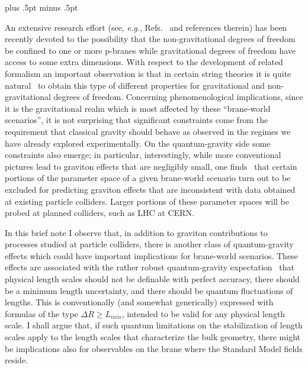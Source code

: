 \newpage
\baselineskip 12pt plus .5pt minus .5pt
\pagestyle{plain} 


An extensive research effort (see, {\it e.g.}, 
Refs.~\cite{addlarge,bw,grwlarge,rs1,rs2,coka,lei,gfg} 
and references therein) has been recently devoted to
the possibility that the non-gravitational degrees of freedom 
be confined to one or more p-branes while 
gravitational degrees of freedom have access 
to some extra dimensions.
With respect to the development of related
formalism an important observation
is that in certain string theories it is quite natural~\cite{bw}
to obtain this type of different properties for gravitational and
non-gravitational degrees of freedom.
Concerning phenomenological implications, 
since it is the gravitational realm which is most affected
by these ``brane-world scenarios'', it is not surprising that
significant constraints come from the requirement that 
classical gravity should behave as observed in the regimes 
we have already explored experimentally.
On the quantum-gravity side some constraints also emerge;
in particular, interestingly,
while more conventional pictures lead
to graviton effects that are negligibly small, 
one finds~\cite{grwlarge}
that certain portions of the parameter
space of a given brane-world scenario turn out to be
excluded for predicting graviton effects that are inconsistent
with data obtained at existing particle colliders.
Larger portions of these parameter spaces will be probed
at planned colliders, such as LHC at CERN.

In this brief note I observe that, in addition to graviton
contributions to processes studied at particle colliders,
there is another class of quantum-gravity
effects which could have important implications for brane-world scenarios.
These effects are associated with 
the rather robust quantum-gravity 
expectation~\cite{wheely,venekonmen,padma,dharam94grf,gacmpla,dbrscatt}  
that physical length scales should not be definable with perfect accuracy,
there should be a minimum length uncertainty, 
and there should be quantum fluctuations of lengths.
This is conventionally (and somewhat generically) expressed with
formulas of the type $\Delta R \ge L_{min}$, intended to be
valid for any physical length scale.
I shall argue that, if 
such quantum limitations on the stabilization of length scales
apply to the length scales that characterize the bulk geometry,
there might be implications also for observables on
the brane where the Standard Model fields reside.


